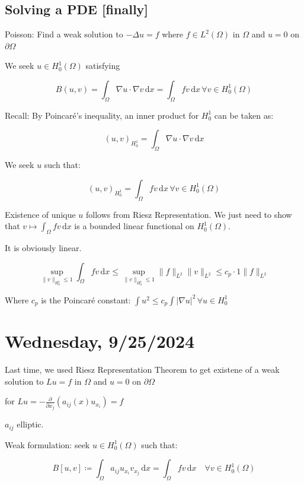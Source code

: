 \documentclass{article}
\theoremstyle{definition}
\begin{document}
\subsection*{Solving a PDE [finally]}

Poisson: Find a weak solution to \(- \Delta u = f\) where \(f\in L^2(\Omega)\) in \(\Omega\) and \(u=0\) on \(\partial \Omega\) 

We seek \(u\in H^1_0(\Omega)\) satisfying

\[
    B(u,v) = \int_{\Omega}^{} \nabla u \cdot \nabla v \,\mathrm{d}x = \int_{\Omega}^{} fv \,\mathrm{d}x \, \forall v\in H^1_0(\Omega)
\]

Recall: By Poincar\'e's inequality, an inner product for \(H^1_0\) can be taken as:

\[
    (u,v)_{H^1_0} = \int_{\Omega}^{} \nabla u \cdot \nabla v \,\mathrm{d}x 
\]

We seek \(u\) such that:

\[
    (u,v)_{H^1_0} = \int_{\Omega}^{} fv \,\mathrm{d}x \, \forall v\in H^1_0(\Omega) 
\]

Existence of unique \(u\) follows from Riesz Representation. We just need to show that \(v \mapsto \int_{\Omega}^{} fv \,\mathrm{d}x \) is a bounded linear functional on \(H^1_0(\Omega)\).

It is obviously linear.

\[
    \sup_{\lVert v \rVert _{H^1_0}\leq 1} \int_{\Omega}^{} fv \,\mathrm{d}x \leq \sup_{\lVert v \rVert _{H^1_0} \leq 1} \lVert f \rVert _{L^2} \lVert v \rVert _{L^2} \leq c_p \cdot 1 \lVert f \rVert _{L^2}
\]

Where \(c_p\) is the Poincar\'e constant: \(\int u^2 \leq c_p \int \vert \nabla u \vert ^2 \, \forall u \in H^1_0\) 


\section*{Wednesday, 9/25/2024}


Last time, we used Riesz Representation Theorem to get existene of a weak solution to \(Lu = f\) in \(\Omega\) and \(u = 0\) on \(\partial \Omega\)

for \(Lu = - \frac{\partial}{\partial x_j} (a_{ij}(x) u_{x_i}) = f\) 

\(a_{ij}\) elliptic.

Weak formulation: seek \(u \in H^1_0(\Omega)\) such that:

\[
    B[u,v] \coloneqq \int_{\Omega}^{} a_{ij} u_{x_i} v_{x_j} \,\mathrm{d}x = \int_{\Omega}^{} fv \,\mathrm{d}x \quad \forall v\in H^1_0(\Omega)
\]
\end{document}
